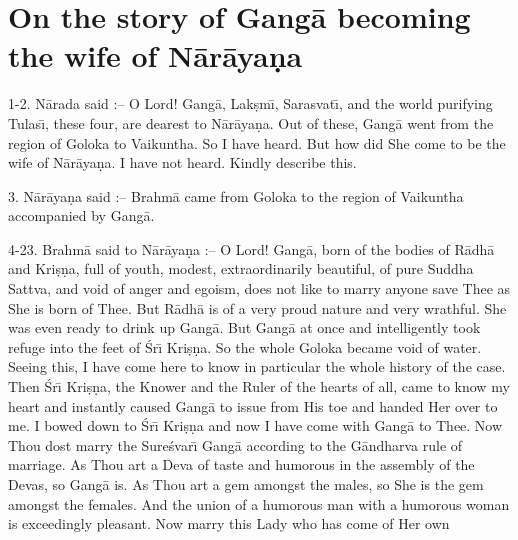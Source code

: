 \chapter{On the story of Gang\=a becoming the wife of N\=ar\=aya\d{n}a}

1-2. N\=arada said :-- O Lord! Gang\=a, Lak\d{s}m\={\i}, Sarasvat\={\i}, and the world purifying Tulas\={\i}, these four, are dearest to N\=ar\=aya\d{n}a. Out of these, Gang\=a went from the region of Goloka to Vaikuntha. So I have heard. But how did She come to be the wife of N\=ar\=aya\d{n}a. I have not heard. Kindly describe this.

3. N\=ar\=aya\d{n}a said :-- Brahm\=a came from Goloka to the region of Vaikuntha accompanied by Gang\=a.

4-23. Brahm\=a said to N\=ar\=aya\d{n}a :-- O Lord! Gang\=a, born of the bodies of R\=adh\=a and Kri\d{s}\d{n}a, full of youth, modest, extraordinarily beautiful, of pure Suddha Sattva, and void of anger and egoism, does not like to marry anyone save Thee as She is born of Thee. But R\=adh\=a is of a very proud nature and very wrathful. She was even ready to drink up Gang\=a. But Gang\=a at once and intelligently took refuge into the feet of \'Sr\={\i} Kri\d{s}\d{n}a. So the whole Goloka became void of water. Seeing this, I have come here to know in particular the whole history of the case. Then \'Sr\={\i} Kri\d{s}\d{n}a, the Knower and the Ruler of the hearts of all, came to know my heart and instantly caused Gang\=a to issue from His toe and handed Her over to me. I bowed down to \'Sr\={\i} Kri\d{s}\d{n}a and now I have come with Gang\=a to Thee. Now Thou dost marry the Sure\'svar\={\i} Gang\=a according to the G\=andharva rule of marriage. As Thou art a Deva of taste and humorous in the assembly of the Devas, so Gang\=a is. As Thou art a gem amongst the males, so She is the gem amongst the females. And the union of a humorous man with a humorous woman is exceedingly pleasant. Now marry this Lady who has come of Her own

